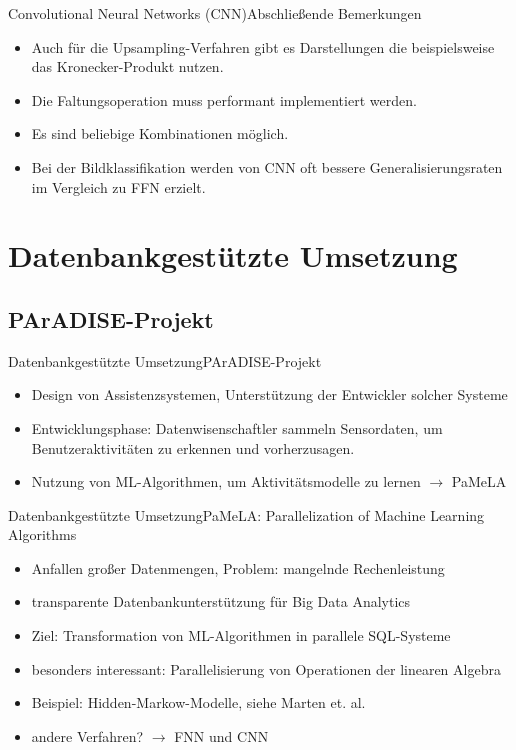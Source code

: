 \documentclass[10pt]{beamer} %
\begin{document}
\begin{frame}{Convolutional Neural Networks (CNN)}{Abschließende Bemerkungen}
   \pause
   \begin{itemize}
      \item Auch für die Upsampling-Verfahren gibt es Darstellungen die beispielsweise das Kronecker-Produkt nutzen.
   
   \pause
   \item Die Faltungsoperation muss performant implementiert werden.
   
   \pause
   \item Es sind beliebige Kombinationen möglich.

   \pause
   \item Bei der Bildklassifikation werden von CNN oft bessere Generalisierungsraten im Vergleich zu FFN erzielt.

\end{itemize}
\end{frame}

\section{Datenbankgestützte Umsetzung}
\subsection{PArADISE-Projekt}
\begin{frame}{Datenbankgestützte Umsetzung}{PArADISE-Projekt}
   \pause
   \begin{itemize}
      \item Design von Assistenzsystemen, Unterstützung der Entwickler solcher Systeme
      \pause
      \item Entwicklungsphase: Datenwisenschaftler sammeln Sensordaten, um Benutzeraktivitäten zu erkennen und vorherzusagen.
      \pause
      \item Nutzung von ML-Algorithmen, um Aktivitätsmodelle zu lernen $\rightarrow$ PaMeLA
   \end{itemize}
\end{frame}

\begin{frame}{Datenbankgestützte Umsetzung}{PaMeLA: Parallelization of Machine Learning Algorithms }
   \pause
   \begin{itemize}
      \item Anfallen großer Datenmengen, Problem: mangelnde Rechenleistung
      \pause
      \item transparente Datenbankunterstützung für Big Data Analytics
      \pause
      \item Ziel: Transformation von ML-Algorithmen in parallele SQL-Systeme
      \pause
      \item besonders interessant: Parallelisierung von Operationen der linearen Algebra
      \pause
      \item Beispiel: Hidden-Markow-Modelle, siehe Marten et. al. \cite{dissmarten}
      \pause 
      \item andere Verfahren? $\rightarrow$ FNN und CNN
   \end{itemize}
\end{frame}
\end{document}
